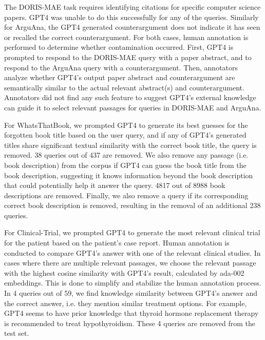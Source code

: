 \documentclass[11pt]{article}
\begin{document}
The DORIS-MAE task requires identifying citations for specific computer science papers. GPT4 was unable to do this successfully for any of the queries. Similarly for ArguAna, the GPT4 generated counterargument does not indicate it has seen or recalled the correct counterargument. For both cases, human annotation is performed to determine whether contamination occurred. First, GPT4 is prompted to respond to the DORIS-MAE query with a paper abstract, and to respond to the ArguAna query with a counterargument. Then, annotators analyze whether GPT4's output paper abstract and counterargument are semantically similar to the actual relevant abstract(s) and counterargument. %
Annotators did not find any such feature to suggest GPT4's external knowledge can guide it to select relevant passages for queries in DORIS-MAE and ArguAna. 

For WhatsThatBook, we prompted GPT4 to generate its best guesses for the forgotten book title based on the user query, and if any of GPT4's generated titles share significant textual similarity with the correct book title, the query is removed. 38 queries out of 437 are removed. We also remove any passage (i.e. book description) from the corpus if GPT4 can guess the book title from the book description, suggesting it knows information beyond the book description that could potentially help it answer the query. 4817 out of 8988 book descriptions are removed. Finally, we also remove a query if its corresponding correct book description is removed, resulting in the removal of an additional 238 queries. 

For Clinical-Trial, we prompted GPT4 to generate the most relevant clinical trial for the patient based on the patient's case report. Human annotation is conducted to compare GPT4's answer with one of the relevant clinical studies. In cases where there are multiple relevant passages, we choose the relevant passage with the highest cosine similarity with GPT4's result, calculated by ada-002 embeddings. This is done to simplify and stabilize the human annotation process. In 4 queries out of 59, we find knowledge similarity between GPT4's answer and the correct answer, i.e. they mention similar treatment options. For example, GPT4 seems to have prior knowledge that thyroid hormone replacement therapy is recommended to treat hypothyroidism. These 4 queries are removed from the test set.
\end{document}

